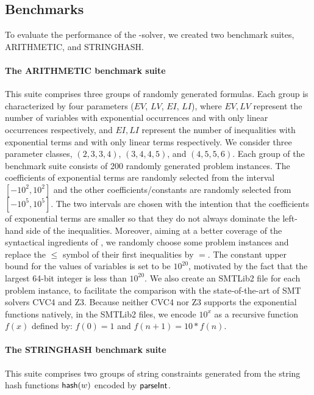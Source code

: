 \vspace*{-3mm}
\subsection{Benchmarks}

To evaluate the performance of the {\paexp}-solver, we created two benchmark suites, ARITHMETIC, and STRINGHASH.

\paragraph{The ARITHMETIC benchmark suite} 
This suite comprises three groups of randomly generated {\paexp} formulas. Each group is characterized by four parameters ($EV$, $LV$, $EI$, $LI$), where $EV, LV$ represent the number of variables with exponential occurrences and with only linear occurrences respectively, and $EI, LI$ represent the number of inequalities with exponential terms and with only linear terms respectively. 
We consider three parameter classes, $(2, 3, 3, 4)$, $(3, 4, 4, 5)$, and $(4, 5, 5, 6)$. 
Each group of the benchmark suite consists of 200 randomly generated problem instances. The coefficients of exponential terms are randomly selected from the interval $[-10^2, 10^2]$ and the other coefficients/constants are randomly selected from $[-10^5, 10^5]$. The two intervals are chosen with the intention that the coefficients of exponential terms are smaller so that they do not always dominate the left-hand side of the inequalities. Moreover, aiming at a better coverage of the syntactical ingredients of {\paexp}, we randomly choose some problem instances and replace the $\le$ symbol of their first inequalities by $=$. The constant upper bound for the values of variables is set to be $10^{20}$, motivated by the fact that the largest 64-bit integer is less than $10^{20}$. We also create an SMTLib2 file for each problem instance, to facilitate the comparison with the state-of-the-art of SMT solvers CVC4 and Z3. Because neither CVC4 nor Z3 supports the exponential functions natively, in the SMTLib2 files, we encode $10^x$ as a recursive function $f(x)$ defined by: $f(0) = 1$ and $f(n+1) = 10*f(n)$.

%

\paragraph{The STRINGHASH benchmark suite} 
This suite comprises two groups of string constraints generated from the string hash functions ${\sf hash}(w)$ encoded by $\textsf{parseInt}$.

